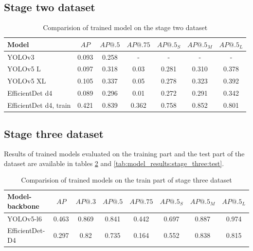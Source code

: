 \subsection{Stage two dataset}

\begin{table}[H]
    \centering
    \begin{tabular}{|l|c|c|c|c|c|c|}
        \hline
        Model                  & $AP$  & $AP@.5$ & $AP@.75$ & $AP@.5_S$ & $AP@.5_M$ & $AP@.5_L$ \\ \hline
        YOLOv3                 & 0.093 & 0.258   & -        & -         & -         & -         \\ \hline
        YOLOv5 L               & 0.097 & 0.318   & 0.03     & 0.281     & 0.310     & 0.378     \\ \hline
        YOLOv5 XL              & 0.105 & 0.337   & 0.05     & 0.278     & 0.323     & 0.392     \\ \hline
        EfficientDet d4        & 0.089 & 0.296   & 0.01     & 0.272     & 0.291     & 0.342     \\ \hline
        EfficientDet d4, train & 0.421 & 0.839   & 0.362    & 0.758     & 0.852     & 0.801     \\ \hline
    \end{tabular}
    \caption{Comparision of trained model on the stage two dataset}
    \label{tab:model_results:stage_two}
\end{table}

\subsection{Stage three dataset}
Results of trained models evaluated on the training part and the test part of the dataset are available in tables \ref{tab:model_results:stage_three:train} and \ref{tab:model_results:stage_three:test}.

\begin{table}[H]
    \centering
    \begin{tabular}{|l|c|c|c|c|c|c|c|}
        \hline
        Model-backbone  & $AP$  & $AP@.3$ & $AP@.5$ & $AP@.75$ & $AP@.5_S$ & $AP@.5_M$ & $AP@.5_L$ \\ \hline
        YOLOv5-l6       & 0.463 & 0.869   & 0.841   & 0.442    & 0.697     & 0.887     & 0.974     \\ \hline
        EfficientDet-D4 & 0.297 & 0.82    & 0.735   & 0.164    & 0.552     & 0.838     & 0.815     \\ \hline
    \end{tabular}
    \caption{Comparision of trained models on the train part of stage three dataset}
    \label{tab:model_results:stage_three:train}
\end{table}


